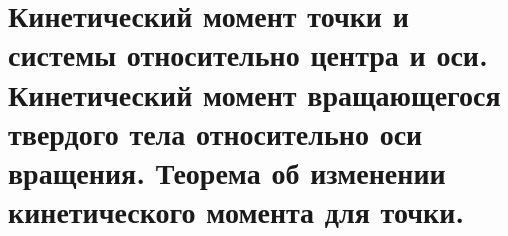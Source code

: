\chapter{Кинетический момент точки и системы относительно центра и оси.
Кинетический момент вращающегося твердого тела относительно оси вращения.
Теорема об изменении кинетического момента для точки.}

\newpage
